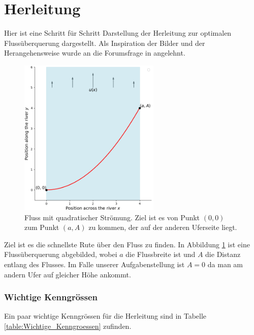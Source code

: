 %
%
%
%
\section{Herleitung
\label{schwimmen:section:naiver_weg}}

Hier ist eine Schritt für Schritt Darstellung der Herleitung zur optimalen Flussüberquerung dargestellt. Als Inspiration der Bilder und der Herangehensweise wurde an die Forumsfrage in \cite{schwimmen:mathForum} angelehnt. 

\begin{figure}
    \centering
        \centering
        \includegraphics[width=0.6\textwidth]{papers/schwimmen/Grafiken/Figure_1-crop.png}	
        \caption{Fluss mit quadratischer Strömung. Ziel ist es von Punkt \((0,0)\) zum Punkt \((a,A)\) zu kommen, der auf der anderen Uferseite liegt.}
        \label{fig:river_template}
\end{figure}

Ziel ist es die schnellste Rute über den Fluss zu finden. In Abbildung \ref{fig:river_template} ist eine Flussüberquerung abgebilded, wobei \(a\) die Flussbreite ist und \(A\) die Distanz entlang des Flusses. Im Falle unserer Aufgabenstellung ist \(A=0\) da man am andern Ufer auf gleicher Höhe ankommt.

\subsubsection{Wichtige Kenngrössen}
Ein paar wichtige Kenngrössen für die Herleitung sind in Tabelle \ref{table:Wichtige_Kenngroessen} zufinden.


